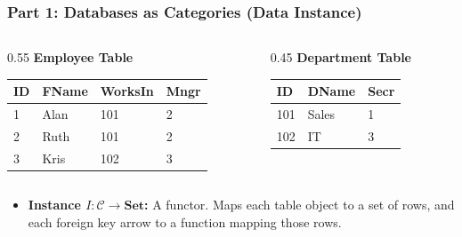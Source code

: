 \documentclass[11pt,t,usepdftitle=false,aspectratio=169]{beamer}
\begin{document}
\begin{frame}
\frametitle{Part 1: Databases as Categories (Data Instance)}

  \begin{columns}[T]
    \begin{column}{0.55\textwidth}
      \textbf{Employee Table} \\
      {\scriptsize
      \begin{tabular}{|l|l|l|l|}
      \hline
      \textbf{ID} & \textbf{FName} & \textbf{WorksIn} & \textbf{Mngr} \\ \hline
      1 & Alan & 101 & 2 \\ \hline
      2 & Ruth & 101 & 2 \\ \hline
      3 & Kris & 102 & 3 \\ \hline
      \end{tabular}
      }
    \end{column}
    \begin{column}{0.45\textwidth}
      \textbf{Department Table} \\
      {\scriptsize
      \begin{tabular}{|l|l|l|}
      \hline
      \textbf{ID} & \textbf{DName} & \textbf{Secr} \\ \hline
      101 & Sales & 1 \\ \hline
      102 & IT & 3 \\ \hline
      \end{tabular}
      }
    \end{column}
  \end{columns}

  \vspace{0.6cm}
  \begin{itemize}
    \item<2-> \textbf{Instance $I: \mathcal{C} \to \mathbf{Set}$:} A functor.
      Maps each table object to a set of rows, and each foreign key arrow to a
      function mapping those rows.
  \end{itemize}
\end{frame}
\end{document}
